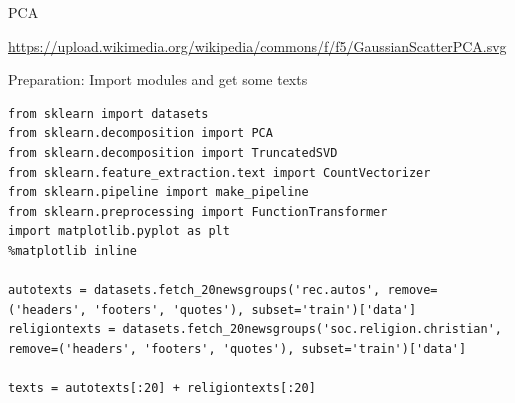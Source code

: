 \documentclass{beamer}
\begin{document}
\begin{frame}{PCA}

\tiny{\url{https://upload.wikimedia.org/wikipedia/commons/f/f5/GaussianScatterPCA.svg}}
\end{frame}



\begin{frame}{Preparation: Import modules and get some texts}
\begin{lstlisting}
from sklearn import datasets
from sklearn.decomposition import PCA
from sklearn.decomposition import TruncatedSVD
from sklearn.feature_extraction.text import CountVectorizer
from sklearn.pipeline import make_pipeline
from sklearn.preprocessing import FunctionTransformer
import matplotlib.pyplot as plt
%matplotlib inline

autotexts = datasets.fetch_20newsgroups('rec.autos', remove=('headers', 'footers', 'quotes'), subset='train')['data']
religiontexts = datasets.fetch_20newsgroups('soc.religion.christian', remove=('headers', 'footers', 'quotes'), subset='train')['data']

texts = autotexts[:20] + religiontexts[:20]
\end{lstlisting}
\end{frame}
\end{document}
